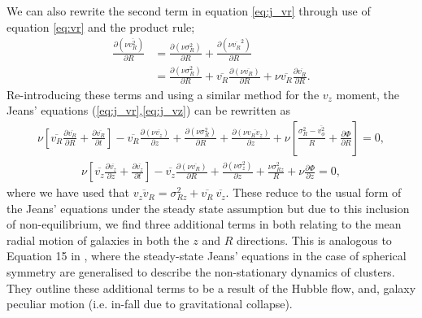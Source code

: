 We can also rewrite the second term in equation \ref{eq:j_vr} through use of equation \ref{eq:vr} and the product rule; 
\begin{align}
\frac{\partial ( \nu \overline{v_R^2})}{\partial R} &= \frac{\partial (\nu \sigma^2_R)}{\partial R} + \frac{\partial ( \nu \overline{v_R}^2)}{\partial R} \\
&= \frac{\partial (\nu \sigma^2_R)}{\partial R} +  \overline{v_R}\frac{\partial (\nu \overline{v_R})}{\partial R} + \nu \overline{v_R} \frac{\partial \overline{v_R}}{\partial R}.
\end{align}
Re-introducing these terms and using a similar method for the $v_z$ moment, the Jeans' equations (\ref{eq:j_vr},\ref{eq:j_vz}) can be rewritten as
\begin{multline}
\nu \left[\overline{v_R}\frac{\partial \overline{v_R}}{\partial R} + \frac{\partial \overline{v_R}}{\partial t} \right] - \overline{v_R} \frac{\partial (\nu \overline{v_z})}{\partial z} + \frac{\partial (\nu \sigma_R^2)}{\partial R} + \frac{\partial (\nu \overline{v_R v_z})}{\partial z} + \nu \left[ \frac{\sigma_R^2 - \overline{v_{\phi}^2}}{R} + \frac{\partial \Phi}{\partial R}\right] = 0,
\end{multline}
\begin{multline}
\nu \left[\overline{v_z}\frac{\partial \overline{v_z}}{\partial z} + \frac{\partial \overline{v_z}}{\partial t} \right] - \overline{v_z} \frac{\partial (\nu \overline{v_R})}{\partial R} + \frac{\partial (\nu \sigma_z^2)}{\partial z} + \frac{\nu \sigma_{Rz}^2}{R} + \nu \frac{\partial \Phi}{\partial z} = 0,
\end{multline}
where we have used that $\overline{v_z v_R} = \sigma_{Rz}^2 + \overline{v_R} \ \overline{v_z}$. These reduce to the usual form of the Jeans' equations under the steady state assumption but due to this inclusion of non-equilibrium, we find three additional terms in both relating to the mean radial motion of galaxies in both the $z$ and $R$ directions. This is analogous to Equation 15 in \citet{falco2013}, where the steady-state Jeans' equations in the case of spherical symmetry are generalised to describe the non-stationary dynamics of clusters. They outline these additional terms to be a result of the Hubble flow, and, galaxy peculiar motion (i.e. in-fall due to gravitational collapse). 

